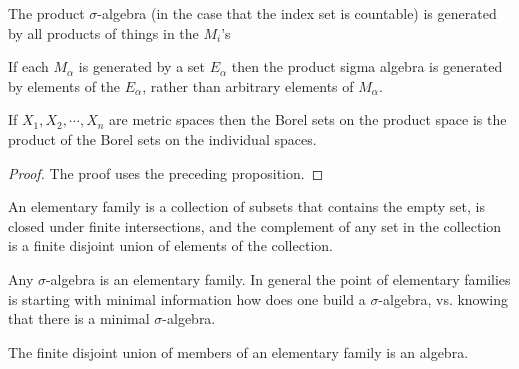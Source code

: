 \begin{prop} The product $\sigma$-algebra (in the case that the index set is countable) is generated by all products of things in the $M_i$'s
\end{prop}

\begin{prop} If each $M_{\alpha}$ is generated by a set $E_{\alpha}$ then the product sigma algebra is generated by elements of the $E_{\alpha}$, rather than arbitrary elements of $M_{\alpha}$. \end{prop}

\begin{thm} If $X_1, X_2, \cdots, X_n$ are metric spaces then the Borel sets on the product space is the product of the Borel sets on the individual spaces.
\end{thm}

\begin{proof}
The proof uses the preceding proposition.
\end{proof}

\begin{dfn} An elementary family is a collection of subsets that contains the empty set, is closed under finite intersections, and the complement of any set in the collection is a finite disjoint union of elements of the collection. \end{dfn}

\begin{example} Any $ \sigma$-algebra is an elementary family. 
In general the point of elementary families is starting with minimal information how does one build a $\sigma$-algebra, vs. knowing that there is a minimal $\sigma$-algebra.\end{example}

\begin{prop} The finite disjoint union of members of an elementary family is an algebra. \end{prop}
